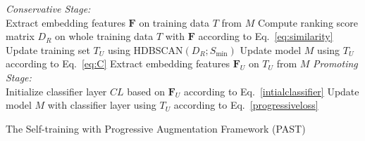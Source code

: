 \documentclass[10pt,twocolumn,letterpaper]{article}
\begin{document}
\setlength{\textfloatsep}{0.1cm}
\begin{algorithm}[t]
	\begin{footnotesize}
		\SetAlgoLined
		{
        \vspace{0.1cm}
		{\emph{Conservative Stage:}}\\
		Extract embedding features $\mathbf{F}$ on training data $T$ from $M$\;
		Compute ranking score matrix $D_R$ on whole training data $T$ with $\mathbf{F}$ according to Eq.~\eqref{eq:similarity}\;
		Update training set $T_U$ using HDBSCAN$(D_R; S_{\min})$\;
		Update model $M$ using $T_U$ according to Eq.~\eqref{eq:C}\;
		Extract embedding features $\mathbf{F}_U$ on $T_U$ from $M$\;
	   \vspace{0.1cm}
		{\emph{Promoting Stage:}}\\
		Initialize classifier layer $CL$ based on $\mathbf{F}_U$ according to Eq.~\eqref{intialclassifier}\;
		Update model $M$ with classifier layer using $T_{U}$ according to Eq.~\eqref{progressiveloss}\;
        }
		\caption{The Self-training with Progressive Augmentation Framework (PAST)}\label{algo}
	\end{footnotesize}
\end{algorithm}
\setlength{\floatsep}{0.15cm}
\end{document}
